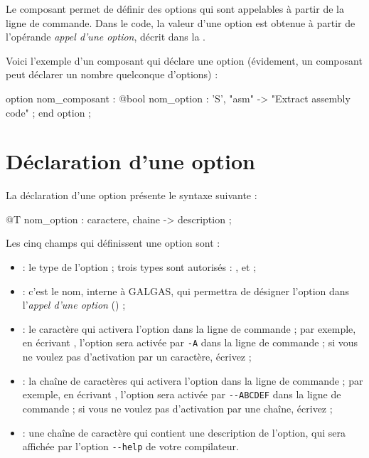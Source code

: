 


Le composant  permet de définir des options qui sont appelables à partir de la ligne de commande. Dans le code, la valeur d'une option est obtenue à partir de l'opérande \emph{appel d'une option}, décrit dans la .

Voici l'exemple d'un composant  qui déclare une option (évidement, un composant  peut déclarer un nombre quelconque d'options) :
\begin{galgascode}
option nom_composant :
  @bool nom_option : 'S', "asm" -> "Extract assembly code" ;
end  option ;
\end{galgascode}


\section{Déclaration d'une option}

La déclaration d'une option présente le syntaxe suivante :
\begin{galgascode}
  @T nom_option : caractere, chaine -> description ;
\end{galgascode}

Les cinq champs qui définissent une option sont :
\begin{itemize}
  \item {} : le type de l'option ; trois types sont autorisés : ,  et  ;
  \item {} : c'est le nom, interne à GALGAS, qui permettra de désigner l'option dans l'\emph{appel d'une option} () ; 
  \item {} : le caractère qui activera l'option dans la ligne de commande ; par exemple, en écrivant , l'option sera activée par \texttt{-A} dans la ligne de commande ; si vous ne voulez pas d'activation par un caractère, écrivez  ;
  \item {} : la chaîne de caractères qui activera l'option dans la ligne de commande ; par exemple, en écrivant , l'option sera activée par \texttt{-{}-ABCDEF} dans la ligne de commande ; si vous ne voulez pas d'activation par une chaîne, écrivez  ;
  \item {} : une chaîne de caractère qui contient une description de l'option, qui sera affichée par l'option \texttt{-{}-help} de votre compilateur.
\end{itemize}








